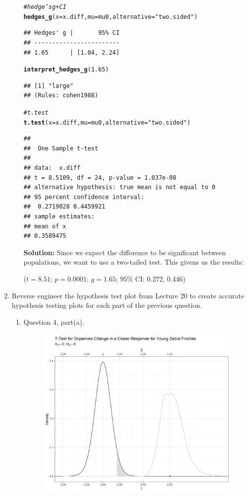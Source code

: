 \documentclass{article}\usepackage[]{graphicx}\usepackage[]{xcolor}
\makeatletter
\newcommand{\hlnum}[1]{\textcolor[rgb]{0.686,0.059,0.569}{#1}}%
\newcommand{\hlsng}[1]{\textcolor[rgb]{0.192,0.494,0.8}{#1}}%
\newcommand{\hlcom}[1]{\textcolor[rgb]{0.678,0.584,0.686}{\textit{#1}}}%
\newcommand{\hldef}[1]{\textcolor[rgb]{0.345,0.345,0.345}{#1}}%
\newcommand{\hlkwc}[1]{\textcolor[rgb]{0.333,0.667,0.333}{#1}}%
\newcommand{\hlkwd}[1]{\textcolor[rgb]{0.737,0.353,0.396}{\textbf{#1}}}%
\newenvironment{kframe}{%
 \def\at@end@of@kframe{}%
 \ifinner\ifhmode%
  \def\at@end@of@kframe{\end{minipage}}%
  \begin{minipage}{\columnwidth}%
 \fi\fi%
 \def\FrameCommand##1{\hskip\@totalleftmargin \hskip-\fboxsep
 \colorbox{shadecolor}{##1}\hskip-\fboxsep
     \hskip-\linewidth \hskip-\@totalleftmargin \hskip\columnwidth}%
 \MakeFramed {\advance\hsize-\width
   \@totalleftmargin\z@ \linewidth\hsize
   \@setminipage}}%
 {\par\unskip\endMakeFramed%
 \at@end@of@kframe}
\newenvironment{knitrout}{}{} %
\makeatother
\begin{document}
\begin{enumerate}
\begin{enumerate}
\begin{knitrout}
\begin{kframe}
\begin{alltt}
\hlcom{# hedge's g + CI}
\hlkwd{hedges_g}\hldef{(}\hlkwc{x} \hldef{= x.diff,} \hlkwc{mu} \hldef{= mu0,} \hlkwc{alternative} \hldef{=} \hlsng{"two.sided"}\hldef{)}
\end{alltt}
\begin{verbatim}
## Hedges' g |       95% CI
## ------------------------
## 1.65      | [1.04, 2.24]
\end{verbatim}
\begin{alltt}
\hlkwd{interpret_hedges_g}\hldef{(}\hlnum{1.65}\hldef{)}
\end{alltt}
\begin{verbatim}
## [1] "large"
## (Rules: cohen1988)
\end{verbatim}
\begin{alltt}
\hlcom{# t.test}
\hlkwd{t.test}\hldef{(}\hlkwc{x}\hldef{=x.diff,} \hlkwc{mu} \hldef{= mu0,} \hlkwc{alternative} \hldef{=} \hlsng{"two.sided"}\hldef{)}
\end{alltt}
\begin{verbatim}
## 
## 	One Sample t-test
## 
## data:  x.diff
## t = 8.5109, df = 24, p-value = 1.037e-08
## alternative hypothesis: true mean is not equal to 0
## 95 percent confidence interval:
##  0.2719028 0.4459921
## sample estimates:
## mean of x 
## 0.3589475
\end{verbatim}
\end{kframe}
\end{knitrout}
\textbf{Solution:} Since we expect the difference to be significant between populations, we want to use a two-tailed test. This givens us the results: 
\begin{center}
($t = 8.51$; $p = 0.0001$; $g = 1.65$; $95\%$ CI: 0.272, 0.446)
\end{center}
\end{enumerate}
\newpage
\item Reverse engineer the hypothesis test plot from Lecture 20 to create accurate
hypothesis testing plots for each part of the previous question.
\begin{enumerate}
  \item Question 4, part(a).
  \begin{figure}[H]
\centering
\includegraphics[width=10cm, height=8.5cm]{task5plot1.png}

\end{figure}
\end{enumerate}
\end{enumerate}
\end{document}
